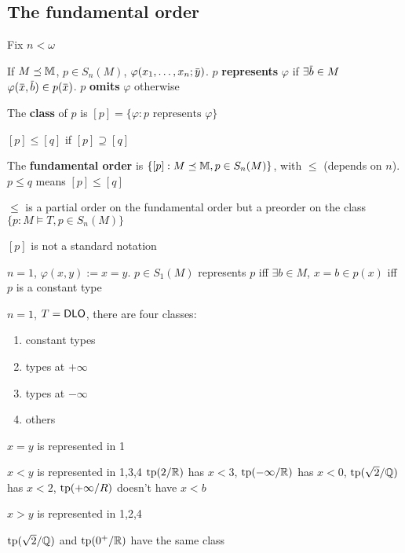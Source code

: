 \documentclass[11pt]{article}
\begin{document}
\subsection{The fundamental order}
\label{sec:org974dbdb}
Fix \(n<\omega\)
\begin{definition}[]
If \(M\preceq\mathbb{M}\), \(p\in S_n(M)\), \(\varphi(x_1,\dots,x_n;\bary)\). \(p\) \textbf{represents} \(\varphi\)
if \(\exists\barb\in M\) \(\varphi(\barx,\barb)\in p(\barx)\). \(p\) \textbf{omits} \(\varphi\) otherwise

The \textbf{class} of \(p\) is \([p]=\{\varphi:p\text{ represents }\varphi\}\)

\([p]\le[q]\) if \([p]\supseteq[q]\)

The \textbf{fundamental order} is \(\{[p]:M\preceq\mathbb{M},p\in S_n(M)\}\), with \(\le\) (depends on \(n\)). \(p\le q\) means \([p]\le[q]\)
\end{definition}

\begin{remark}
\(\le\) is a partial order on the fundamental order but a preorder on the class \(\{p:M\vDash T,p\in S_n(M)\}\)
\end{remark}

\([p]\) is not a standard notation

\begin{examplle}[]
\(n=1\), \(\varphi(x,y):=x=y\). \(p\in S_1(M)\) represents \(p\) iff \(\exists b\in M\), \(x=b\in p(x)\) iff \(p\)
is a constant type
\end{examplle}

\begin{examplle}[]
\(n=1\), \(T=\operatorname{\textsf{DLO}}\), there are four classes:
\begin{enumerate}
\item constant types
\item types at \(+\infty\)
\item types at \(-\infty\)
\item others
\end{enumerate}


\begin{center}\end{center}

\(x=y\) is represented in 1

\(x<y\) is represented in 1,3,4 \(\operatorname{tp}(2/\mathbb{R})\) has \(x<3\), \(\operatorname{tp}(-\infty/\mathbb{R})\)
has \(x<0\), \(\operatorname{tp}(\sqrt{2}/\mathbb{Q})\) has \(x<2\), \(\operatorname{tp}(+\infty/R)\) doesn't have \(x<b\)

\(x>y\) is represented in 1,2,4

\(\operatorname{tp}(\sqrt{2}/\mathbb{Q})\) and \(\operatorname{tp}(0^+/\mathbb{R})\) have the same class
\end{examplle}
\end{document}
